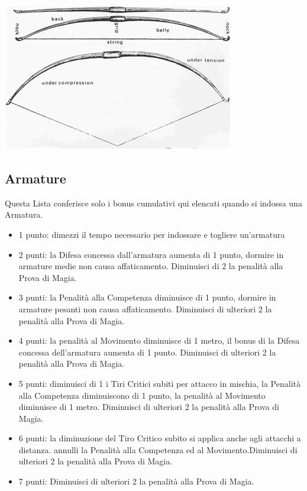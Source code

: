 \begin{multicols}{2}
\begin{center}
\includegraphics[width=0.7\linewidth]{immagini/arma-arco.png}
\end{center}

\subsection{Armature} \label{listaarmature}

Questa Lista conferisce solo i bonus cumulativi qui elencati quando si indossa una Armatura.

\begin{itemize}[leftmargin=*] \setlength{\itemsep}{0pt}

\item 1 punto: dimezzi il tempo necessario per indossare e togliere un'armatura
\item 2 punti: la Difesa concessa dall'armatura aumenta di 1 punto, dormire in armature medie non causa affaticamento. Diminuisci di 2 la penalità alla Prova di Magia.
\item 3 punti: la Penalità alla Competenza diminuisce di 1 punto, dormire in armature pesanti non causa affaticamento. Diminuisci di ulteriori 2 la penalità alla Prova di Magia.
\item 4 punti: la penalità al Movimento diminuisce di 1 metro, il bonus di la Difesa concessa dell'armatura aumenta di 1 punto. Diminuisci di ulteriori 2 la penalità alla Prova di Magia.
\item 5 punti: diminuisci di 1 i Tiri Critici subiti per attacco in mischia, la Penalità alla Competenza diminuiscono di 1 punto, la penalità al Movimento diminuisce di 1 metro. Diminuisci di ulteriori 2 la penalità alla Prova di Magia.
\item 6 punti: la diminuzione del Tiro Critico subito si applica anche agli attacchi a distanza. annulli la Penalità alla Competenza ed al Movimento.Diminuisci di ulteriori 2 la penalità alla Prova di Magia.
\item 7 punti: Diminuisci di ulteriori 2 la penalità alla Prova di Magia.
\end{itemize}


\end{multicols}
